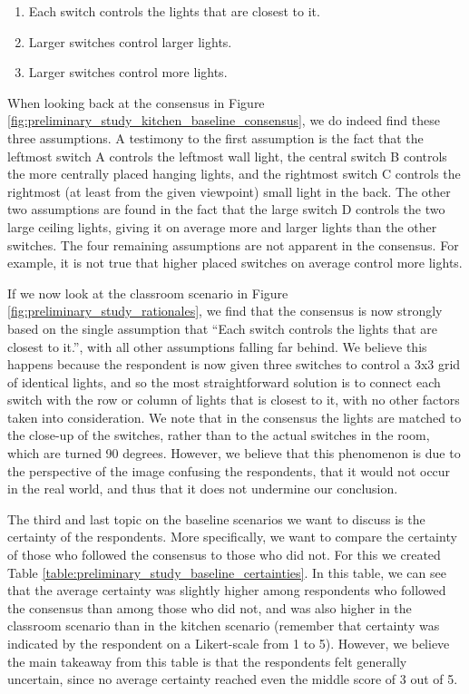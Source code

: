 \begin{enumerate}
    \item Each switch controls the lights that are closest to it.
    \item Larger switches control larger lights.
    \item Larger switches control more lights.
\end{enumerate}

When looking back at the consensus in Figure \ref{fig:preliminary_study_kitchen_baseline_consensus}, we do indeed find these three assumptions. A testimony to the first assumption is the fact that the leftmost switch A controls the leftmost wall light, the central switch B controls the more centrally placed hanging lights, and the rightmost switch C controls the rightmost (at least from the given viewpoint) small light in the back. The other two assumptions are found in the fact that the large switch D controls the two large ceiling lights, giving it on average more and larger lights than the other switches. The four remaining assumptions are not apparent in the consensus. For example, it is not true that higher placed switches on average control more lights.


If we now look at the classroom scenario in Figure \ref{fig:preliminary_study_rationales}, we find that the consensus is now strongly based on the single assumption that ``Each switch controls the lights that are closest to it.'', with all other assumptions falling far behind. We believe this happens because the respondent is now given three switches to control a 3x3 grid of identical lights, and so the most straightforward solution is to connect each switch with the row or column of lights that is closest to it, with no other factors taken into consideration. We note that in the consensus the lights are matched to the close-up of the switches, rather than to the actual switches in the room, which are turned 90 degrees. However, we believe that this phenomenon is due to the perspective of the image confusing the respondents, that it would not occur in the real world, and thus that it does not undermine our conclusion.

The third and last topic on the baseline scenarios we want to discuss is the certainty of the respondents. More specifically, we want to compare the certainty of those who followed the consensus to those who did not. For this we created Table \ref{table:preliminary_study_baseline_certainties}. In this table, we can see that the average certainty was slightly higher among respondents who followed the consensus than among those who did not, and was also higher in the classroom scenario than in the kitchen scenario (remember that certainty was indicated by the respondent on a Likert-scale from 1 to 5). However, we believe the main takeaway from this table is that the respondents felt generally uncertain, since no average certainty reached even the middle score of 3 out of 5.

